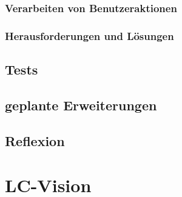 \documentclass[a4paper,12pt,top=2.5cm,bottom=2.5cm, left=2.5cm, right=2.5cm, numbers=noenddot]{scrartcl}
\begin{document}
\subsubsection{Verarbeiten von Benutzeraktionen}
\subsubsection{Herausforderungen und Lösungen}
\subsection{Tests}
\subsection{geplante Erweiterungen}
\subsection{Reflexion}

\section{LC-Vision}

\printbibliography
\end{document}
